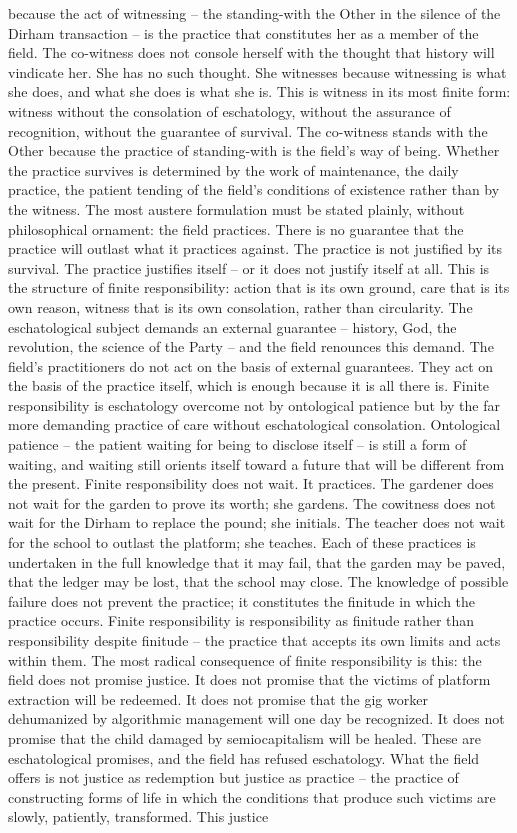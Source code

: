 because the act of witnessing – the standing-with the Other in the silence of the Dirham transaction – is the practice that constitutes her as a member of the field. The co-witness does not console herself with the thought that history will vindicate her. She has no such thought. She witnesses because witnessing is what she does, and what she does is what she is. This is witness in its most finite form: witness without the consolation of eschatology, without the assurance of recognition, without the guarantee of survival. The co-witness stands with the Other because the practice of standing-with is the field’s way of being. Whether the practice survives is determined by the work of maintenance, the daily practice, the patient tending of the field’s conditions of existence rather than by the witness. The most austere formulation must be stated plainly, without philosophical ornament: the field practices. There is no guarantee that the practice will outlast what it practices against. The practice is not justified by its survival. The practice justifies itself – or it does not justify itself at all. This is the structure of finite responsibility: action that is its own ground, care that is its own reason, witness that is its own consolation, rather than circularity. The eschatological subject demands an external guarantee – history, God, the revolution, the science of the Party – and the field renounces this demand. The field’s practitioners do not act on the basis of external guarantees. They act on the basis of the practice itself, which is enough because it is all there is. Finite responsibility is eschatology overcome not by ontological patience but by the far more demanding practice of care without eschatological consolation. Ontological patience – the patient waiting for being to disclose itself – is still a form of waiting, and waiting still orients itself toward a future that will be different from the present. Finite responsibility does not wait. It practices. The gardener does not wait for the garden to prove its worth; she gardens. The cowitness does not wait for the Dirham to replace the pound; she initials. The teacher does not wait for the school to outlast the platform; she teaches. Each of these practices is undertaken in the full knowledge that it may fail, that the garden may be paved, that the ledger may be lost, that the school may close. The knowledge of possible failure does not prevent the practice; it constitutes the finitude in which the practice occurs. Finite responsibility is responsibility as finitude rather than responsibility despite finitude – the practice that accepts its own limits and acts within them. The most radical consequence of finite responsibility is this: the field does not promise justice. It does not promise that the victims of platform extraction will be redeemed. It does not promise that the gig worker dehumanized by algorithmic management will one day be recognized. It does not promise that the child damaged by semiocapitalism will be healed. These are eschatological promises, and the field has refused eschatology. What the field offers is not justice as redemption but justice as practice – the practice of constructing forms of life in which the conditions that produce such victims are slowly, patiently, transformed. This justice 